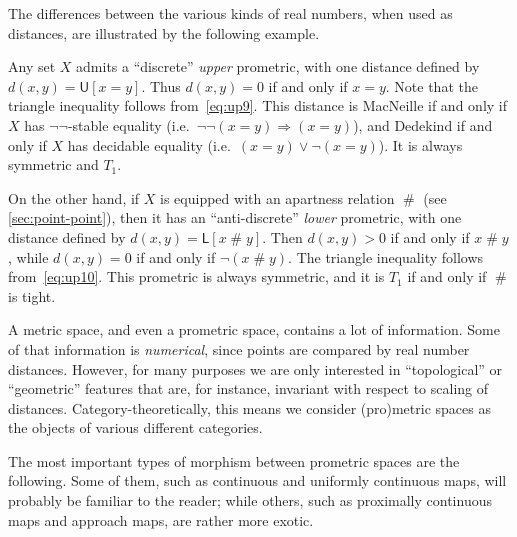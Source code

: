 \documentclass{article}
\def\U[#1]{\mathsf{U}[#1]}
\def\L[#1]{\mathsf{L}[#1]}
\def\apart{\mathrel{\#}}
\let\implies\Rightarrow
\def\nn{\ensuremath{\neg\neg}}
\begin{document}
The differences between the various kinds of real numbers, when used as distances, are illustrated by the following example.

\begin{eg}
  Any set $X$ admits a ``discrete'' \emph{upper} prometric, with one distance defined by
  \( d(x,y) = \U[x=y] \).
  Thus $d(x,y)=0$ if and only if $x=y$.
  Note that the triangle inequality follows from~\eqref{eq:up9}.
  This distance is MacNeille if and only if $X$ has \nn-stable equality (i.e.\ $\neg\neg(x=y)\implies (x=y)$), and Dedekind if and only if $X$ has decidable equality (i.e.\ $(x=y)\lor \neg(x=y)$).
  It is always symmetric and $T_1$.

  On the other hand, if $X$ is equipped with an apartness relation $\apart$ (see \cref{sec:point-point}), then it has an ``anti-discrete'' \emph{lower} prometric, with one distance defined by
  \( d(x,y) = \L[x\apart y] \).
  Then $d(x,y)>0$ if and only if $x\apart y$, while $d(x,y)=0$ if and only if $\neg(x\apart y)$.
  The triangle inequality follows from~\eqref{eq:up10}.
  This prometric is always symmetric, and it is $T_1$ if and only if $\apart$ is tight.
\end{eg}

A metric space, and even a prometric space, contains a lot of information.
Some of that information is \emph{numerical}, since points are compared by real number distances.
However, for many purposes we are only interested in ``topological'' or ``geometric'' features that are, for instance, invariant with respect to scaling of distances.
Category-theoretically, this means we consider (pro)metric spaces as the objects of various different categories.

The most important types of morphism between prometric spaces are the following.
Some of them, such as continuous and uniformly continuous maps, will probably be familiar to the reader; while others, such as proximally continuous maps and approach maps, are rather more exotic.
\end{document}
